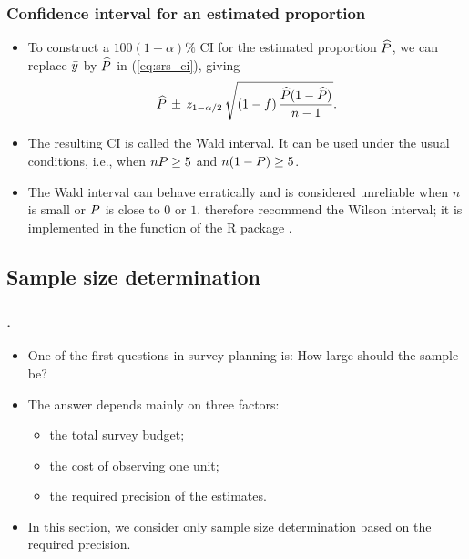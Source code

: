\documentclass{my_eth_beamer}
\numberwithin{equation}{section}
\begin{document}
\begin{frame}
    \frametitle{\normalsize Confidence interval for an estimated proportion}
    \begin{itemize}
    \setlength{\itemsep}{12pt}
        \item To construct a $100(1 - \alpha)\%$ CI for the estimated
            proportion $\widehat{P}$, we can replace $\bar{y}$ by $\widehat{P}$ in
            (\ref{eq:srs_ci}), giving
            \begin{equation*}
                \widehat{P} \, \pm \, z_{1 - \alpha / 2} \, \sqrt{(1 -f) \,
                    \frac{\widehat{P} (1 - \widehat{P})}{n - 1}}.
            \end{equation*}
        \item The resulting CI is called the \alert{Wald interval}. It can be
            used under the usual conditions, i.e., when $n P \geq 5$
            and $n(1 - P) \geq 5$.
        \item The Wald interval can behave erratically and is considered
            unreliable when $n$ is small or $P$ is close to $0$ or $1$.
            \citet{brown_cai_etal_2001} therefore recommend the
            \alert{Wilson interval}; it is implemented in the function
             of the \textsf{R} package .
    \end{itemize}
\end{frame}

\subsection{Sample size determination}

\begin{frame}
    \frametitle{\insertsectionnumber.\insertsubsectionnumber~\insertsubsection}
    \begin{itemize}
    \setlength{\itemsep}{12pt}
        \item One of the first questions in survey planning is:
            \alert{How large should the sample be?}
        \item The answer depends mainly on three \alert{factors}:
            \vspace{0.25em}
            \begin{itemize}
            \setlength{\itemsep}{6pt}
                \item the total survey budget;
                \item the cost of observing one unit;
                \item the required precision of the estimates.
            \end{itemize}
        \item In this section, we consider only \alert{sample size
            determination} based on the \alert{required precision}.
    \end{itemize}
\end{frame}
\end{document}
